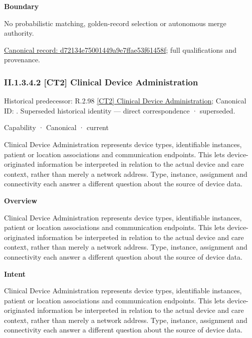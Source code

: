 \textbf{Boundary}



No probabilistic matching, golden-record selection or autonomous merge authority.


{\footnotesize \href{../../../../continuum/strategy/capability/feature/d72134e75001449a9e7ffae53f61458f.md}{Canonical record: d72134e75001449a9e7ffae53f61458f}; full qualifications and provenance.}\par
\subsubsection*{II.1.3.4.2 [CT2] Clinical Device Administration}
\label{navigation:II.1.3.4.2}

{\small Historical predecessor: R.2.98 \hyperref[element:3792be10541e4d68b3f740b1ba964966]{[CT2] Clinical Device Administration}; Canonical ID: \texttt{}. Superseded historical identity — direct correspondence · superseded.}\par
\label{element:31bcd6fda0d14cc8b992cdca39a3cbed}
{\small Capability · Canonical · current}\par

Clinical Device Administration represents device types, identifiable instances, patient or location associations and communication endpoints. This lets device-originated information be interpreted in relation to the actual device and care context, rather than merely a network address. Type, instance, assignment and connectivity each answer a different question about the source of device data.



\textbf{Overview}



Clinical Device Administration represents device types, identifiable instances, patient or location associations and communication endpoints. This lets device-originated information be interpreted in relation to the actual device and care context, rather than merely a network address. Type, instance, assignment and connectivity each answer a different question about the source of device data.



\textbf{Intent}



Clinical Device Administration represents device types, identifiable instances, patient or location associations and communication endpoints. This lets device-originated information be interpreted in relation to the actual device and care context, rather than merely a network address. Type, instance, assignment and connectivity each answer a different question about the source of device data.



